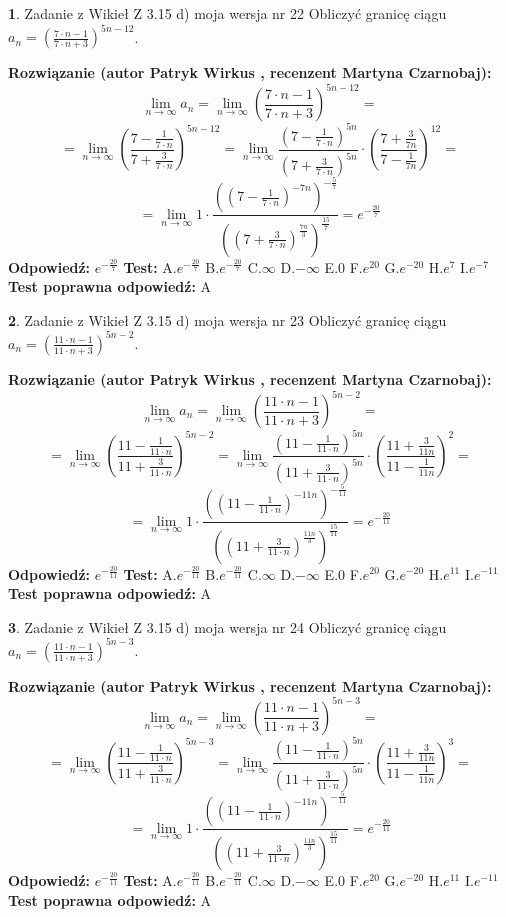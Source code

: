 \documentclass[12pt, a4paper]{article}
\theoremstyle{definition} %
\newtheorem{zad}{}
\newcommand{\zadStart}[1]{\begin{zad}#1\newline}
\newcommand{\zadStop}{\end{zad}}
\newcommand{\rozwStart}[2]{\noindent \textbf{Rozwiązanie (autor #1 , recenzent #2): }\newline}
\newcommand{\rozwStop}{\newline}
\newcommand{\odpStart}{\noindent \textbf{Odpowiedź:}\newline}
\newcommand{\odpStop}{\newline}
\newcommand{\testStart}{\noindent \textbf{Test:}\newline}
\newcommand{\testStop}{\newline}
\newcommand{\kluczStart}{\noindent \textbf{Test poprawna odpowiedź:}\newline}
\newcommand{\kluczStop}{\newline}
\begin{document}
\zadStart{Zadanie z Wikieł Z 3.15 d) moja wersja nr 22}
Obliczyć granicę ciągu $a_{n}=(\frac{7\cdot n - 1}{7 \cdot n + 3})^{5n-12}$.
\zadStop
\rozwStart{Patryk Wirkus}{Martyna Czarnobaj}
$$\lim\limits_{n\to\infty} a_{n} = \lim\limits_{n\to\infty}(\frac{7\cdot n - 1}{7 \cdot n + 3})^{5n-12}=$$
$$=\lim\limits_{n\to\infty}(\frac{7 - \frac{1}{7\cdot n}}{7 + \frac{3}{7 \cdot n}})^{5n-12}=\lim\limits_{n\to\infty}\frac{(7 - \frac{1}{7\cdot n})^{5n}}{(7 + \frac{3}{7\cdot n})^{5n}} \cdot (\frac{7+\frac{3}{7n}}{7-\frac{1}{7n}})^{12}=$$
$$=\lim\limits_{n\to\infty} 1 \cdot \frac{((7-\frac{1}{7 \cdot n})^{-7n})^{-\frac{5}{7}}}{((7+\frac{3}{7 \cdot n})^{\frac{7n}{3}})^{\frac{15}{7}}} =e^{-\frac{20}{7}}$$
\rozwStop
\odpStart
$e^{-\frac{20}{7}}$
\odpStop
\testStart
A.$ e^{-\frac{20}{7}}$
B.$ e^{-\frac{20}{7}}$
C.$\infty$
D.$-\infty$
E.$0$
F.$e^{20}$
G.$e^{-20}$
H.$e^{7}$
I.$e^{-7}$
\testStop
\kluczStart
A
\kluczStop



\zadStart{Zadanie z Wikieł Z 3.15 d) moja wersja nr 23}
Obliczyć granicę ciągu $a_{n}=(\frac{11\cdot n - 1}{11 \cdot n + 3})^{5n-2}$.
\zadStop
\rozwStart{Patryk Wirkus}{Martyna Czarnobaj}
$$\lim\limits_{n\to\infty} a_{n} = \lim\limits_{n\to\infty}(\frac{11\cdot n - 1}{11 \cdot n + 3})^{5n-2}=$$
$$=\lim\limits_{n\to\infty}(\frac{11 - \frac{1}{11\cdot n}}{11 + \frac{3}{11 \cdot n}})^{5n-2}=\lim\limits_{n\to\infty}\frac{(11 - \frac{1}{11\cdot n})^{5n}}{(11 + \frac{3}{11\cdot n})^{5n}} \cdot (\frac{11+\frac{3}{11n}}{11-\frac{1}{11n}})^{2}=$$
$$=\lim\limits_{n\to\infty} 1 \cdot \frac{((11-\frac{1}{11 \cdot n})^{-11n})^{-\frac{5}{11}}}{((11+\frac{3}{11 \cdot n})^{\frac{11n}{3}})^{\frac{15}{11}}} =e^{-\frac{20}{11}}$$
\rozwStop
\odpStart
$e^{-\frac{20}{11}}$
\odpStop
\testStart
A.$ e^{-\frac{20}{11}}$
B.$ e^{-\frac{20}{11}}$
C.$\infty$
D.$-\infty$
E.$0$
F.$e^{20}$
G.$e^{-20}$
H.$e^{11}$
I.$e^{-11}$
\testStop
\kluczStart
A
\kluczStop



\zadStart{Zadanie z Wikieł Z 3.15 d) moja wersja nr 24}
Obliczyć granicę ciągu $a_{n}=(\frac{11\cdot n - 1}{11 \cdot n + 3})^{5n-3}$.
\zadStop
\rozwStart{Patryk Wirkus}{Martyna Czarnobaj}
$$\lim\limits_{n\to\infty} a_{n} = \lim\limits_{n\to\infty}(\frac{11\cdot n - 1}{11 \cdot n + 3})^{5n-3}=$$
$$=\lim\limits_{n\to\infty}(\frac{11 - \frac{1}{11\cdot n}}{11 + \frac{3}{11 \cdot n}})^{5n-3}=\lim\limits_{n\to\infty}\frac{(11 - \frac{1}{11\cdot n})^{5n}}{(11 + \frac{3}{11\cdot n})^{5n}} \cdot (\frac{11+\frac{3}{11n}}{11-\frac{1}{11n}})^{3}=$$
$$=\lim\limits_{n\to\infty} 1 \cdot \frac{((11-\frac{1}{11 \cdot n})^{-11n})^{-\frac{5}{11}}}{((11+\frac{3}{11 \cdot n})^{\frac{11n}{3}})^{\frac{15}{11}}} =e^{-\frac{20}{11}}$$
\rozwStop
\odpStart
$e^{-\frac{20}{11}}$
\odpStop
\testStart
A.$ e^{-\frac{20}{11}}$
B.$ e^{-\frac{20}{11}}$
C.$\infty$
D.$-\infty$
E.$0$
F.$e^{20}$
G.$e^{-20}$
H.$e^{11}$
I.$e^{-11}$
\testStop
\kluczStart
A
\kluczStop
\end{document}
